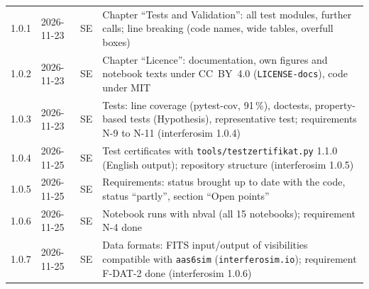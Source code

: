 {\begin{longtable}{ll l >{\raggedright\arraybackslash}p{8.4cm}}
    1.0.1 & 2026-11-23 & SE & Chapter \enquote{Tests and Validation}: all test modules, further calls; line breaking (code names, wide tables, overfull boxes) \\
    1.0.2 & 2026-11-23 & SE & Chapter \enquote{Licence}: documentation, own figures and notebook texts under CC~BY~4.0 (\texttt{LICENSE-docs}), code under MIT \\
    1.0.3 & 2026-11-23 & SE & Tests: line coverage (pytest-cov, 91\,\%), doctests, property-based tests (Hypothesis), representative test; requirements N-9 to N-11 (interferosim 1.0.4) \\
    1.0.4 & 2026-11-25 & SE & Test certificates with \texttt{tools/testzertifikat.py} 1.1.0 (English output); repository structure (interferosim 1.0.5) \\
    1.0.5 & 2026-11-25 & SE & Requirements: status brought up to date with the code, status \enquote{partly}, section \enquote{Open points} \\
    1.0.6 & 2026-11-25 & SE & Notebook runs with nbval (all 15 notebooks); requirement N-4 done \\
    1.0.7 & 2026-11-25 & SE & Data formats: FITS input/output of visibilities compatible with \texttt{aas6sim} (\texttt{interferosim.io}); requirement F-DAT-2 done (interferosim 1.0.6) \\
\end{longtable}
}

